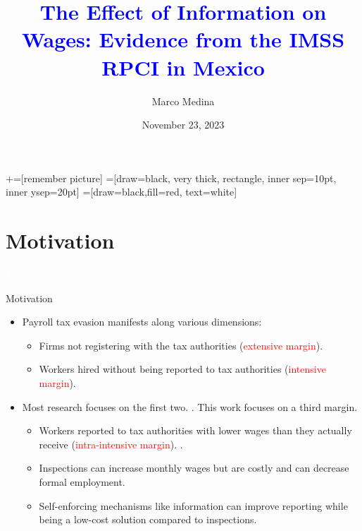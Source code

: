 \documentclass[notes,11pt, aspectratio=169]{beamer}
\title[]{\textcolor{blue}{The Effect of Information on Wages: Evidence from the IMSS RPCI in Mexico}}
\author[Marco Medina]{Marco Medina}
\date{November 23, 2023}
\newenvironment{transitionframe}{
  \setbeamercolor{background canvas}{bg=blue}
  \begin{frame}}{
    \end{frame}
}
\begin{document}
\newcommand\marktopleft[1]{%
    \tikz[overlay,remember picture] 
        \node (marker-#1-a) at (-.3em,.3em) {};%
}
\newcommand\markbottomright[2]{%
    \tikz[overlay,remember picture] 
        \node (marker-#1-b) at (0em,0em) {};%
}
+=[remember picture] 
 =[draw=black, very thick, rectangle, inner sep=10pt, inner ysep=20pt]
 =[draw=black,fill=red, text=white]

\begin{frame}
\maketitle
\end{frame}

\section{Motivation}
\begin{transitionframe}
  \begin{center}
    \Huge \textcolor{white}{Motivation}
  \end{center}
\end{transitionframe}


\begin{frame}[fragile]{Motivation}
  \begin{itemize}[<+->]
    \vfill\item Payroll tax evasion manifests along various dimensions:
    \begin{itemize}
        \vfill\item Firms not registering with the tax authorities (\textcolor{red}{extensive margin}).
        \vfill\item Workers hired without being reported to tax authorities (\textcolor{red}{intensive margin}).
    \end{itemize}
    \vfill\item Most research focuses on the first two. \citep{Ulyssea}. This work focuses on a third margin.
    \begin{itemize}
        \vfill\item Workers reported to tax authorities with lower wages than they actually receive (\textcolor{red}{intra-intensive margin}). \citep{kumler2020enlisting}.
        \vfill\item Inspections can increase monthly wages but are costly and can decrease formal employment. \citep{samaniego2020increasing}
        \vfill\item Self-enforcing mechanisms like information can improve reporting while being a low-cost solution compared to inspections.
    \end{itemize}
    \end{itemize}
\end{frame}
\end{document}
